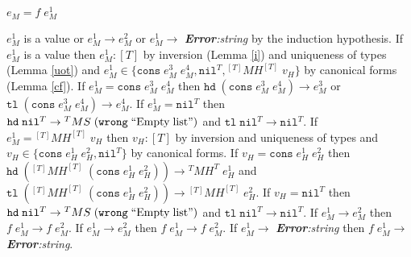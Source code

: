\begin{case}
$e_{M}=f\;e_{M}^{1}$

$e_{M}^{1}$ is a value or $e_{M}^{1}\rightarrow e_{M}^{2}$ or $e_{M}^{1}\rightarrow$ \emph{\textbf{Error}:\;string} by the induction hypothesis.  If $e_{M}^{1}$ is a value then $e_{M}^{1}:[T]$ by inversion (Lemma \ref{i}) and uniqueness of types (Lemma \ref{uot}) and $e_{M}^{1}\in\lbrace\mathtt{cons}\;e_{M}^{3}\;e_{M}^{4},\mathtt{nil}^{T},{^{[T]}M}H^{[T]}\;v_{H}\rbrace$ by canonical forms (Lemma \ref{cf}).  If $e_{M}^{1}=\mathtt{cons}\;e_{M}^{3}\;e_{M}^{4}$ then $\mathtt{hd}\;(\mathtt{cons}\;e_{M}^{3}\;e_{M}^{4})\rightarrow e_{M}^{3}$ or $\mathtt{tl}\;(\mathtt{cons}\;e_{M}^{3}\;e_{M}^{4})\rightarrow e_{M}^{4}$.  If $e_{M}^{1}=\mathtt{nil}^{T}$ then $\mathtt{hd}\;\mathtt{nil}^{T}\rightarrow{^{T}M}S\;(\mathtt{wrong}\;\mathrm{``Empty\;list"})$ and $\mathtt{tl}\;\mathtt{nil}^{T}\rightarrow\mathtt{nil}^{T}$.  If $e_{M}^{1}={^{[T]}M}H^{[T]}\;v_{H}$ then $v_{H}:[T]$ by inversion and uniqueness of types and $v_{H}\in\lbrace\mathtt{cons}\;e_{H}^{1}\;e_{H}^{2},\mathtt{nil}^{T}\rbrace$ by canonical forms.  If $v_{H}=\mathtt{cons}\;e_{H}^{1}\;e_{H}^{2}$ then $\mathtt{hd}\;(^{[T]}MH^{[T]}\;(\mathtt{cons}\;e_{H}^{1}\;e_{H}^{2}))\rightarrow{^{T}M}H^{T}\;e_{H}^{1}$ and $\mathtt{tl}\;(^{[T]}MH^{[T]}\;(\mathtt{cons}\;e_{H}^{1}\;e_{H}^{2}))\rightarrow{^{[T]}M}H^{[T]}\;e_{H}^{2}$.  If $v_{H}=\mathtt{nil}^{T}$ then $\mathtt{hd}\;\mathtt{nil}^{T}\rightarrow{^{T}M}S\;(\mathtt{wrong}\;\mathrm{``Empty\;list"})$ and $\mathtt{tl}\;\mathtt{nil}^{T}\rightarrow\mathtt{nil}^{T}$.  If $e_{M}^{1}\rightarrow e_{M}^{2}$ then $f\;e_{M}^{1}\rightarrow f\;e_{M}^{2}$.  If $e_{M}^{1}\rightarrow e_{M}^{2}$ then $f\;e_{M}^{1}\rightarrow f\;e_{M}^{2}$.  If $e_{M}^{1}\rightarrow$ \emph{\textbf{Error}:\;string} then $f\;e_{M}^{1}\rightarrow$ \emph{\textbf{Error}:\;string}.
\end{case}